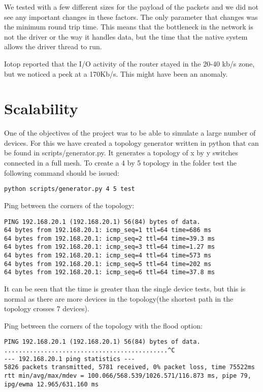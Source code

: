 We tested with a few different sizes for the payload of the packets and we did not see any important changes in these
factors. The only parameter that changes was the minimum round trip time.
This means that the bottleneck in the network is not the driver or the way it handles data, but the time
that the native system allows the driver thread to run.

Iotop reported that the I/O activity of the router stayed in the 20-40 kb/s zone, but we noticed a peek
at a 170Kb/s. This might have been an anomaly.

\section{Scalability}
\label{sec:scalability}

One of the objectives of the project was to be able to simulate a large number of devices. For this we have
created a topology generator written in python that can be found in scripts/generator.py. It generates a topology of
x by y switches connected in a full mesh. To create a 4 by 5 topology in the folder test the following command
should be issued:
\lstset{language=text, caption=Generating a topology}
\begin{lstlisting}
python scripts/generator.py 4 5 test
\end{lstlisting}

Ping between the corners of the topology:

\lstset{language=text, caption=Ping}
\begin{lstlisting}
PING 192.168.20.1 (192.168.20.1) 56(84) bytes of data.
64 bytes from 192.168.20.1: icmp_seq=1 ttl=64 time=686 ms
64 bytes from 192.168.20.1: icmp_seq=2 ttl=64 time=39.3 ms
64 bytes from 192.168.20.1: icmp_seq=3 ttl=64 time=1.27 ms
64 bytes from 192.168.20.1: icmp_seq=4 ttl=64 time=573 ms
64 bytes from 192.168.20.1: icmp_seq=5 ttl=64 time=202 ms
64 bytes from 192.168.20.1: icmp_seq=6 ttl=64 time=37.8 ms
\end{lstlisting}
It can be seen that the time is greater than the single device
tests, but this is normal as there are more devices in the topology(the shortest path in the topology crosses 7 devices).

Ping between the corners of the topology with the flood option:
\lstset{language=text, caption=Ping}
\begin{lstlisting}
PING 192.168.20.1 (192.168.20.1) 56(84) bytes of data.
.............................................^C                                
--- 192.168.20.1 ping statistics ---
5826 packets transmitted, 5781 received, 0% packet loss, time 75522ms
rtt min/avg/max/mdev = 100.066/568.539/1026.571/116.873 ms, pipe 79, ipg/ewma 12.965/631.160 ms
\end{lstlisting}

